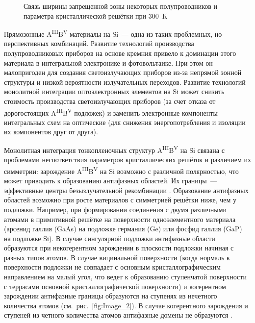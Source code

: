 \begin{figure}[ht]
	\caption{Связь ширины запрещенной зоны некоторых полупроводников и параметра кристаллической решётки при 300~\si{\kelvin}}\label{fig:Image_1}
\end{figure}

Прямозонные A\textsuperscript{III}B\textsuperscript{V} материалы на Si~--- одна из таких проблемных, но перспективных комбинаций. Развитие технологий производства полупроводниковых приборов на основе кремния привело к  доминации этого материала в интегральной электронике и фотовольтаике. При этом он малопригоден для создания светоизлучающих приборов из-за непрямой зонной структуры и низкой вероятности излучательных переходов. Развитие технологий монолитной интеграции оптоэлектронных элементов на Si может снизить стоимость производства светоизлучающих приборов (за счет отказа от дорогостоящих A\textsuperscript{III}B\textsuperscript{V} подложек) и заменить электронные компоненты интегральных схем на оптические (для снижения энергопотребления и изоляции их компонентов друг от друга).

Монолитная интеграция тонкопленочных структур A\textsuperscript{III}B\textsuperscript{V} на Si связана с проблемами несоответствия параметров кристаллических решёток и различием их симметрии: зарождение A\textsuperscript{III}B\textsuperscript{V} на Si возможно с различной полярностью, что может приводить к образованию антифазных областей. Их границы~--- эффективные центры безызлучательной рекомбинации \cite{Takagi1998}. Образование антифазных областей возможно при росте материалов с симметрией решётки ниже, чем у подложки. Например, при формировании соединения с двумя различными атомами в примитивной решётке на поверхности одноэлементного материала (арсенид галлия (GaAs) на подложке германия (Ge) или фосфид галлия (GaP) на подложке Si). В случае сингулярной подложки антифазные области образуются при некогерентном зарождении в плоскости подложки начиная с разных типов атомов. В случае вицинальной поверхности (когда нормаль к поверхности подложки не совпадает с основным кристаллографическим направлением на малый угол, что ведет к образованию ступенчатой поверхности с террасами основной кристаллографической поверхности) и когерентном зарождении антифазные границы образуются на ступенях из нечетного количества атомов (см.~рис.~\cref{fig:Image_2}). В случае когерентного зарождения и ступеней из четного количества атомов антифазные домены не образуются \cite{Faucher2016}.

